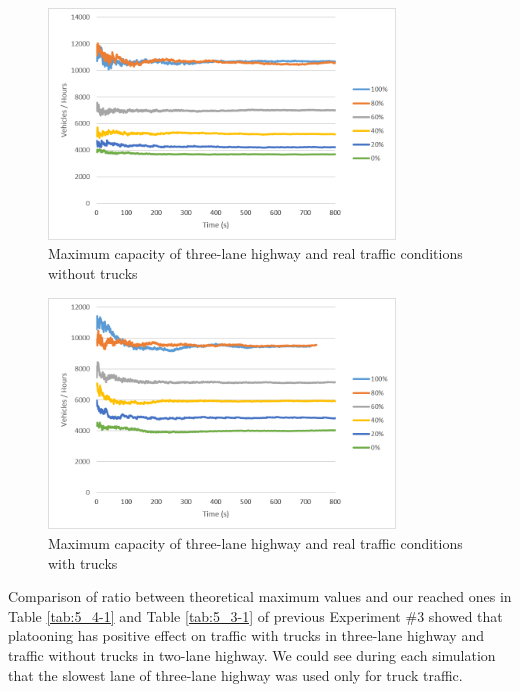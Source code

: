 \begin{figure}[ph]
\centering
\includegraphics[width=0.82\textwidth,height=0.82\textheight,keepaspectratio]{figures/Chapter_5/5_3l_NT_maxCap.png}
\centering
\protect\caption[Maximum capacity of three-lane highway and real traffic conditions without trucks]{\label{fig:5_4-1}Maximum capacity of three-lane highway and real traffic conditions without trucks}
\end{figure}

\begin{figure}[ph]
\centering
\includegraphics[width=0.82\textwidth,height=0.82\textheight,keepaspectratio]{figures/Chapter_5/5_3l_T_maxCap.png}
\centering
\protect\caption[Maximum capacity of three-lane highway and real traffic conditions with trucks]{\label{fig:5_4-2}Maximum capacity of three-lane highway and real traffic conditions with trucks}
\end{figure}


Comparison of ratio between theoretical maximum values and our reached ones in Table \ref{tab:5_4-1} and Table \ref{tab:5_3-1} of previous Experiment \#3 showed that platooning has positive effect on traffic with trucks in three-lane highway and traffic without trucks in two-lane highway. We could see during each simulation that the slowest lane of three-lane highway was used only for truck traffic.

